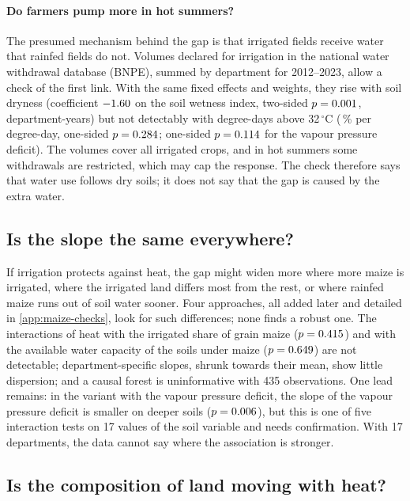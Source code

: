 \paragraph{Do farmers pump more in hot summers?} The presumed mechanism behind the gap is that irrigated fields receive water that rainfed fields do not. Volumes declared for irrigation in the national water withdrawal database (BNPE), summed by department for 2012--2023, allow a check of the first link. With the same fixed effects and weights, they rise with soil dryness (coefficient $-1.60$ on the soil wetness index, two-sided $p = 0.001$, \VolN{} department-years) but not detectably with degree-days above 32\,$^{\circ}$C (\VolHeatPct\,\% per degree-day, one-sided $p = 0.284$; one-sided $p = 0.114$ for the vapour pressure deficit). The volumes cover all irrigated crops, and in hot summers some withdrawals are restricted, which may cap the response. The check therefore says that water use follows dry soils; it does not say that the gap is caused by the extra water.

\subsection{Is the slope the same everywhere?}
\label{subsec:maize-heterogeneity}

If irrigation protects against heat, the gap might widen more where more maize is irrigated, where the irrigated land differs most from the rest, or where rainfed maize runs out of soil water sooner. Four approaches, all added later and detailed in \cref{app:maize-checks}, look for such differences; none finds a robust one. The interactions of heat with the irrigated share of grain maize ($p = 0.415$) and with the available water capacity of the soils under maize ($p = 0.649$) are not detectable; department-specific slopes, shrunk towards their mean, show little dispersion; and a causal forest is uninformative with 435 observations. One lead remains: in the variant with the vapour pressure deficit, the slope of the vapour pressure deficit is smaller on deeper soils ($p = 0.006$), but this is one of five interaction tests on 17 values of the soil variable and needs confirmation. With 17 departments, the data cannot say where the association is stronger.

\subsection{Is the composition of land moving with heat?}
\label{subsec:maize-composition}

